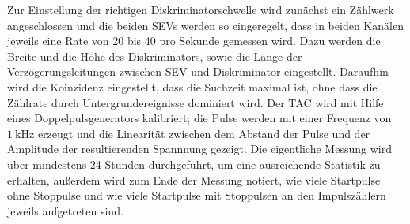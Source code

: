 Zur Einstellung der richtigen Diskriminatorschwelle wird zunächst ein Zählwerk angeschlossen und die beiden SEVs werden so eingeregelt, dass in beiden Kanälen jeweils eine Rate von 20 bis 40 pro Sekunde gemessen wird. Dazu werden die Breite und die Höhe des Diskriminators, sowie die Länge der Verzögerungsleitungen zwischen SEV und Diskriminator eingestellt. Daraufhin wird die Koinzidenz eingestellt, dass die Suchzeit maximal ist, ohne dass die Zählrate durch Untergrundereignisse dominiert wird. Der TAC wird mit Hilfe eines Doppelpulsgenerators kalibriert; die Pulse werden mit einer Frequenz von $\SI{1}{\kilo\hertz}$ erzeugt und die Linearität zwischen dem Abstand der Pulse und der Amplitude der resultierenden Spannnung gezeigt. Die eigentliche Messung wird über mindestens 24 Stunden durchgeführt, um eine ausreichende Statistik zu erhalten, außerdem wird zum Ende der Messung notiert, wie viele Startpulse ohne Stoppulse und wie viele Startpulse mit Stoppulsen an den Impulszählern jeweils aufgetreten sind.

\FloatBarrier
